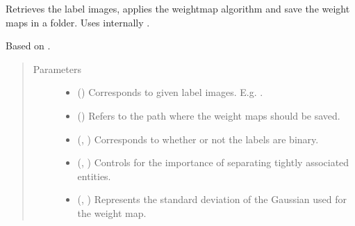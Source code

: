 \documentclass[letterpaper,10pt,english]{sphinxmanual}
\begin{document}

\begin{fulllineitems}
\label{\detokenize{utils/util:utils.util.do_save_wm}}
Retrieves the label images, applies the weight\sphinxhyphen{}map algorithm and save the weight maps in a folder. Uses
internally .

Based on .
\begin{quote}\begin{description}
\item[{Parameters}] \leavevmode\begin{itemize}
\item {} 
 () \textendash{} Corresponds to given label images. E.g. .

\item {} 
 () \textendash{} Refers to the path where the weight maps should be saved.

\item {} 
 (, ) \textendash{} Corresponds to whether or not the labels are binary.

\item {} 
 (, ) \textendash{} Controls for the importance of separating tightly associated entities.

\item {} 
 (, ) \textendash{} Represents the standard deviation of the Gaussian used for the weight
map.

\end{itemize}

\end{description}\end{quote}

\end{fulllineitems}
\end{document}
